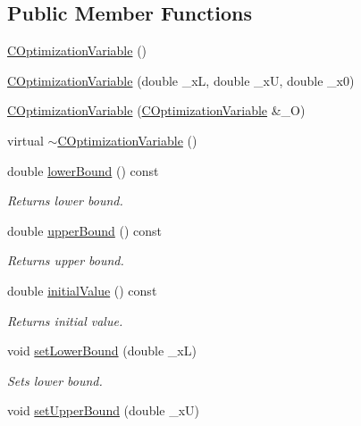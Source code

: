 \subsection*{Public Member Functions}
\begin{DoxyCompactItemize}
\item 
\hyperlink{class_c_optimization_variable_a2af34948cc83069d6dd74a64397d85e0}{C\-Optimization\-Variable} ()
\item 
\hyperlink{class_c_optimization_variable_a349e830200ea6f76c47022e8aa6fd598}{C\-Optimization\-Variable} (double \-\_\-x\-L, double \-\_\-x\-U, double \-\_\-x0)
\item 
\hyperlink{class_c_optimization_variable_a410d3b78689566c940f3abd93bbfe0e4}{C\-Optimization\-Variable} (\hyperlink{class_c_optimization_variable}{C\-Optimization\-Variable} \&\-\_\-\-O)
\item 
virtual \hyperlink{class_c_optimization_variable_ab31271eb7663a4a48f4bed228bf54682}{$\sim$\-C\-Optimization\-Variable} ()
\item 
double \hyperlink{class_c_optimization_variable_af1b1ad75d642bf0455964e9357586bc2}{lower\-Bound} () const 
\begin{DoxyCompactList}\small\item\em Returns lower bound. \end{DoxyCompactList}\item 
double \hyperlink{class_c_optimization_variable_a9affc19ff1cfc507ab7e1df812d85bcb}{upper\-Bound} () const 
\begin{DoxyCompactList}\small\item\em Returns upper bound. \end{DoxyCompactList}\item 
double \hyperlink{class_c_optimization_variable_a2b61e79e0f74bb88afdcc788fabe1c6e}{initial\-Value} () const 
\begin{DoxyCompactList}\small\item\em Returns initial value. \end{DoxyCompactList}\item 
void \hyperlink{class_c_optimization_variable_ae92d781a0e9e38bc368ba69c996bb19a}{set\-Lower\-Bound} (double \-\_\-x\-L)
\begin{DoxyCompactList}\small\item\em Sets lower bound. \end{DoxyCompactList}\item 
void \hyperlink{class_c_optimization_variable_a6baed0144cd86d9032a2effa770a49f5}{set\-Upper\-Bound} (double \-\_\-x\-U)

\end{DoxyCompactItemize}
